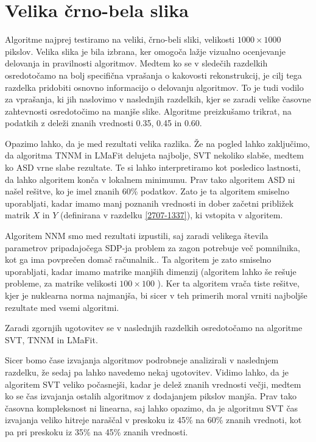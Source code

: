 \section{Velika črno-bela slika} \label{1307-2250}
Algoritme najprej testiramo na veliki, črno-beli sliki, velikosti $1000\times1000$ pikslov. Velika slika je bila izbrana, ker omogoča lažje vizualno ocenjevanje delovanja in pravilnosti algoritmov.
Medtem ko se v sledečih razdelkih osredotočamo na bolj specifična vprašanja o kakovosti rekonstrukcij, je cilj tega razdelka pridobiti osnovno informacijo o delovanju algoritmov. 
To je tudi vodilo za vprašanja, ki
jih naslovimo v naslednjih razdelkih, kjer
se zaradi velike časovne zahtevnosti osredotočimo na manjše slike. Algoritme preizkušamo trikrat, na podatkih z deleži znanih vrednosti 0.35, 0.45  in 0.60.


\FloatBarrier


Opazimo lahko, da je med rezultati velika razlika. Že na pogled lahko zaključimo, da algoritma TNNM in LMaFit delujeta najbolje, SVT nekoliko slabše, medtem ko
ASD vrne slabe rezultate. Te si lahko interpretiramo kot posledico lastnosti, da lahko algoritem konča v lokalnem minimumu. Prav tako algoritem ASD ni našel rešitve, ko je imel znanih 60\% podatkov. Zato je ta algoritem smiselno uporabljati, kadar imamo manj poznanih vrednosti in dober začetni približek matrik $X$ in $Y$ (definirana v razdelku \ref{2707-1337}), ki vstopita v algoritem.

Algoritem NNM smo med rezultati izpustili, saj zaradi velikega števila parametrov pripadajočega SDP-ja problem za zagon potrebuje več pomnilnika, kot ga ima povprečen domač računalnik.. Ta algoritem je zato smiselno uporabljati, kadar imamo matrike manjših dimenzij (algoritem lahko še rešuje probleme, za matrike velikosti $100 \times 100$ \cite{NNM-Candes}). 
Ker ta algoritem vrača tiste rešitve, kjer je nuklearna norma najmanjša, bi sicer v teh primerih moral vrniti najboljše rezultate med vsemi algoritmi. 

Zaradi zgornjih ugotovitev se v naslednjih razdelkih osredotočamo na algoritme SVT, TNNM in LMaFit.

Sicer bomo čase izvajanja algoritmov podrobneje analizirali v naslednjem razdelku, že sedaj pa lahko navedemo nekaj ugotovitev. Vidimo lahko, da je algoritem SVT veliko počasnejši, kadar je delež znanih vrednosti večji, medtem ko se čas izvajanja ostalih algoritmov z dodajanjem pikslov manjša. Prav tako časovna kompleksnost ni linearna, saj lahko opazimo, da je algoritmu SVT čas izvajanja veliko hitreje naraščal v preskoku iz 45\% na 60\% znanih vrednoti, kot pa pri preskoku iz 35\% na 45\% znanih vrednosti.


